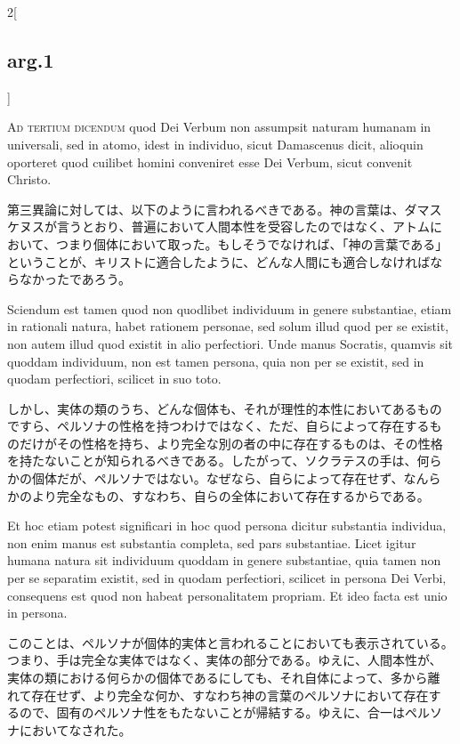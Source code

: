 \documentclass[paper=a4paper,fontsize=10pt,jafontsize=9pt,titlepage]{jlreq}
\begin{document}
\begin{paracol}{2}[\subsection{arg.1}]
\switchcolumn*[\subsection{ad.3}]

{\scshape Ad tertium dicendum} quod Dei Verbum non assumpsit naturam
humanam in universali, sed in atomo, idest in individuo, sicut
Damascenus dicit, alioquin oporteret quod cuilibet homini conveniret
esse Dei Verbum, sicut convenit Christo.

\switchcolumn

第三異論に対しては、以下のように言われるべきである。神の言葉は、ダマス
ケヌスが言うとおり、普遍において人間本性を受容したのではなく、アトムに
おいて、つまり個体において取った。もしそうでなければ、「神の言葉である」
ということが、キリストに適合したように、どんな人間にも適合しなければな
らなかったであろう。

\switchcolumn*

Sciendum est tamen quod non quodlibet individuum in genere
substantiae, etiam in rationali natura, habet rationem personae, sed
solum illud quod per se existit, non autem illud quod existit in alio
perfectiori. Unde manus Socratis, quamvis sit quoddam individuum, non
est tamen persona, quia non per se existit, sed in quodam perfectiori,
scilicet in suo toto.

\switchcolumn

しかし、実体の類のうち、どんな個体も、それが理性的本性においてあるもの
ですら、ペルソナの性格を持つわけではなく、ただ、自らによって存在するも
のだけがその性格を持ち、より完全な別の者の中に存在するものは、その性格
を持たないことが知られるべきである。したがって、ソクラテスの手は、何ら
かの個体だが、ペルソナではない。なぜなら、自らによって存在せず、なんら
かのより完全なもの、すなわち、自らの全体において存在するからである。

\switchcolumn*

Et hoc etiam potest significari in hoc quod persona dicitur substantia
individua, non enim manus est substantia completa, sed pars
substantiae. Licet igitur humana natura sit individuum quoddam in
genere substantiae, quia tamen non per se separatim existit, sed in
quodam perfectiori, scilicet in persona Dei Verbi, consequens est quod
non habeat personalitatem propriam. Et ideo facta est unio in persona.

\switchcolumn

このことは、ペルソナが個体的実体と言われることにおいても表示されている。
つまり、手は完全な実体ではなく、実体の部分である。ゆえに、人間本性が、
実体の類における何らかの個体であるにしても、それ自体によって、多から離
れて存在せず、より完全な何か、すなわち神の言葉のペルソナにおいて存在す
るので、固有のペルソナ性をもたないことが帰結する。ゆえに、合一はペルソ
ナにおいてなされた。

\end{paracol}
\newpage
\end{document}
